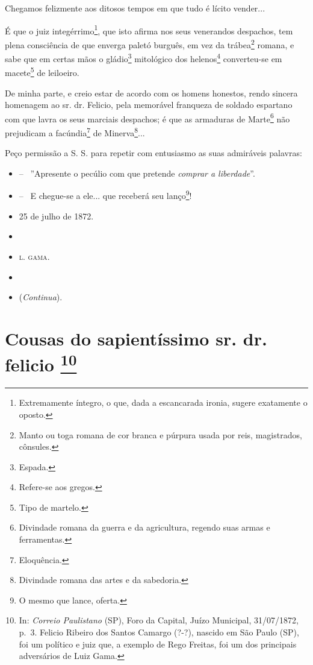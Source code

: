 Chegamos felizmente aos ditosos tempos em que tudo é lícito vender...

É que o juiz integérrimo\footnote{ Extremamente íntegro, o que, dada a
  escancarada ironia, sugere exatamente o oposto.}, que isto afirma nos
seus venerandos despachos, tem plena consciência de que enverga paletó
burguês, em vez da trábea\footnote{ Manto ou toga romana de cor branca
  e púrpura usada por reis, magistrados, cônsules.} romana, e sabe que
em certas mãos o gládio\footnote{ Espada.} mitológico dos
helenos\footnote{ Refere-se aos gregos.} converteu-se em
macete\footnote{ Tipo de martelo.} de leiloeiro.

De minha parte, e creio estar de acordo com os homens honestos, rendo
sincera homenagem ao sr. dr. Felicio, pela memorável franqueza de
soldado espartano com que lavra os seus marciais despachos; é que as
armaduras de Marte\footnote{ Divindade romana da guerra e da
  agricultura, regendo suas armas e ferramentas.} não prejudicam a
facúndia\footnote{ Eloquência.} de Minerva\footnote{ Divindade romana
  das artes e da sabedoria.}...

Peço permissão a S. S. para repetir com entusiasmo as suas admiráveis
palavras:

\begin{itemize}
\item
  -- ~''Apresente o pecúlio com que pretende \emph{comprar a liberdade}''.
\item
  -- ~E chegue-se a ele... que receberá seu lanço\footnote{ O mesmo que
    lance, oferta.}!
\item
  25 de julho de 1872.
\item
\item
 \textsc{l. gama}.
\item
\item
  (\emph{Continua}).
\end{itemize}

\chapter{Cousas do sapientíssimo sr. dr. felicio
\footnote{ In: \emph{Correio Paulistano} (SP), Foro da Capital, Juízo
  Municipal, 31/07/1872, p.~3. Felicio Ribeiro dos Santos Camargo (?-?),
  nascido em São Paulo (SP), foi um político e juiz que, a exemplo de
  Rego Freitas, foi um dos principais adversários de Luiz Gama.}} %

